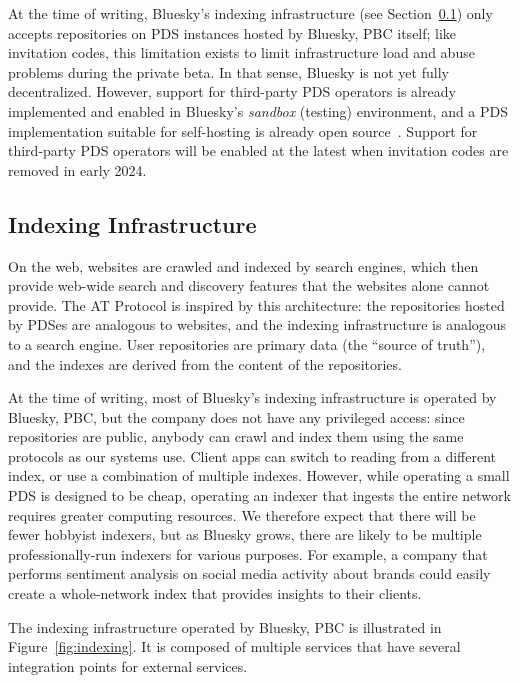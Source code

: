 \documentclass[sigconf,review]{acmart}
\begin{document}
At the time of writing, Bluesky's indexing infrastructure (see Section~\ref{sec:indexing}) only accepts repositories on PDS instances hosted by Bluesky, PBC itself; like invitation codes, this limitation exists to limit infrastructure load and abuse problems during the private beta.
In that sense, Bluesky is not yet fully decentralized.
However, support for third-party PDS operators is already implemented and enabled in Bluesky's \emph{sandbox} (testing) environment, and a PDS implementation suitable for self-hosting is already open source~\cite{BlueskyGithub}.
Support for third-party PDS operators will be enabled at the latest when invitation codes are removed in early 2024.

\subsection{Indexing Infrastructure}\label{sec:indexing}

On the web, websites are crawled and indexed by search engines, which then provide web-wide search and discovery features that the websites alone cannot provide.
The AT Protocol is inspired by this architecture: the repositories hosted by PDSes are analogous to websites, and the indexing infrastructure is analogous to a search engine.
User repositories are primary data (the ``source of truth''), and the indexes are derived from the content of the repositories.

At the time of writing, most of Bluesky's indexing infrastructure is operated by Bluesky, PBC, but the company does not have any privileged access: since repositories are public, anybody can crawl and index them using the same protocols as our systems use.
Client apps can switch to reading from a different index, or use a combination of multiple indexes.
However, while operating a small PDS is designed to be cheap, operating an indexer that ingests the entire network requires greater computing resources.
We therefore expect that there will be fewer hobbyist indexers, but as Bluesky grows, there are likely to be multiple professionally-run indexers for various purposes.
For example, a company that performs sentiment analysis on social media activity about brands could easily create a whole-network index that provides insights to their clients.

The indexing infrastructure operated by Bluesky, PBC is illustrated in Figure~\ref{fig:indexing}.
It is composed of multiple services that have several integration points for external services.
\end{document}
